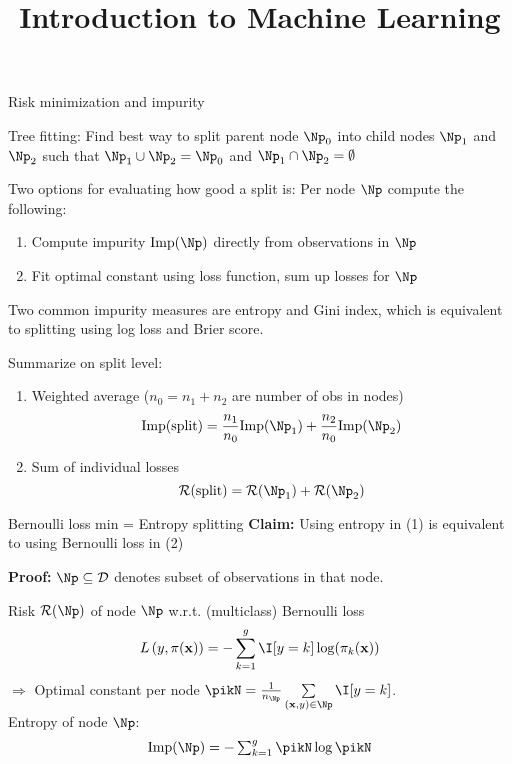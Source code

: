 \documentclass[11pt,compress,t,notes=noshow, xcolor=table]{beamer}
\title{Introduction to Machine Learning}
\begin{document}
    

\begin{framei}[sep=M]{Risk minimization and impurity}

\item Tree fitting: Find best way to split parent node $\Np_0$ into child nodes $\Np_1$ and $\Np_2$ such that $\Np_1 \cup \Np_2 = \Np_0$ and $\Np_1 \cap \Np_2 = \emptyset$
\item Two options for evaluating how good a split is: Per node $\Np$ compute the following:
\begin{enumerate}
\item Compute impurity $\text{Imp}(\Np)$ directly from observations in $\Np$
\item Fit optimal constant using loss function, sum up losses for $\Np$
\end{enumerate}
\item  Two common impurity measures are entropy and Gini index, which is equivalent to splitting using log loss and Brier score.
\item Summarize on split level:
\begin{enumerate}
\item Weighted average ($n_0 = n_1 + n_2$ are number of obs in nodes)
$$\text{Imp(split)} = \frac{n_1}{n_0} \text{Imp}(\Np_1) + \frac{n_2}{n_0} \text{Imp}(\Np_2)$$
\item Sum of individual losses
$$\risk(\text{split}) = \risk(\Np_1) + \risk(\Np_2)$$
\end{enumerate}

\end{framei}

\begin{frame}{Bernoulli loss min = Entropy splitting}
\textbf{Claim:} Using entropy in (1) 
is equivalent to using Bernoulli loss in (2) %

\vfill

\textbf{Proof:} %
$\Np \subseteq \D$ denotes subset of observations in that node. 

Risk $\risk(\Np)$ of node $\Np$ w.r.t. (multiclass) Bernoulli loss  
$$
\Lpixy = -\sum_{k = 1}^g \I [y=k] \log (\pi_k(\xv))
$$
$\Rightarrow$ Optimal constant per node $\pikN = \frac{1}{n_{\Np}} \sum\limits_{(\xv,y) \in \Np} \I [y=k]$.\\

Entropy of node $\Np$:
$$
\text{Imp}(\Np) = -\textstyle\sum_{k = 1}^g \pikN \log \pikN %
$$

\end{frame}
\end{document}
